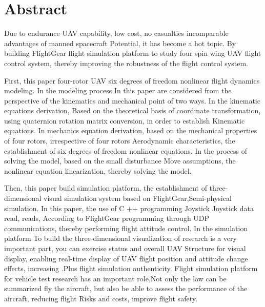 ﻿%
%
%

%
%
\renewcommand{\baselinestretch}{1.5}
\fontsize{12pt}{13pt}\selectfont

\chapter[ABSTRACT（英文摘要）]{\textsf{\textbf{Abstract}}}
Due to endurance UAV capability, low cost, no casualties incomparable advantages of manned spacecraft
Potential, it has become a hot topic. By building FlightGear flight simulation platform to study four spin wing UAV flight control system, thereby improving the robustness of the flight control system.

First, this paper four-rotor UAV six degrees of freedom nonlinear flight dynamics modeling. In the modeling process
In this paper are considered from the perspective of the kinematics and mechanical point of two ways. In the kinematic equations derivation, Based on the theoretical basis of coordinate transformation, using quaternion rotation matrix conversion, in order to establish Kinematic equations. In mechanics equation derivation, based on the mechanical properties of four rotors, irrespective of four rotors Aerodynamic characteristics, the establishment of six degrees of freedom nonlinear equations. In the process of solving the model, based on the small disturbance Move assumptions, the nonlinear equation linearization, thereby solving the model.

Then, this paper build simulation platform, the establishment of three-dimensional visual simulation system based on FlightGear,Semi-physical simulation. In this paper, the use of C ++ programming Joystick Joystick data read, reads,
According to FlightGear programming through UDP communications, thereby performing flight attitude control. In the simulation platform To build the three-dimensional visualization of research is a very important part, you can exercise status and overall UAV Structure for visual display, enabling real-time display of UAV flight position and attitude change effects, increasing .Plus flight simulation authenticity. Flight simulation platform for vehicle test research has an important role,Not only the law can be summarized fly the aircraft, but also be able to assess the performance of the aircraft, reducing flight Risks and costs, improve flight safety.

